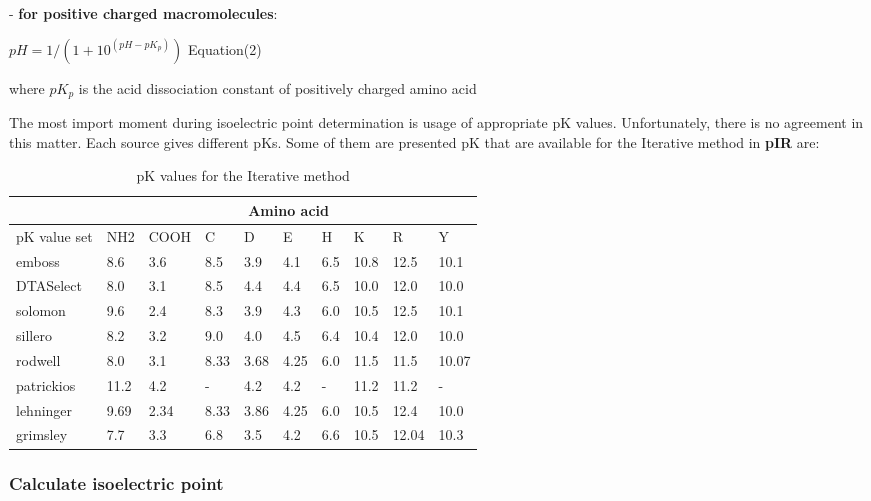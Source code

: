 \documentclass{article}
\begin{document}
- \textbf{for positive charged macromolecules}:

\begin{center}
       \( pH = 1/(1+10^{(pH - pK_p)}) \)   Equation(2)
\end{center}

where \(pK_p\) is the acid dissociation constant of positively charged amino acid


The most import moment during isoelectric point determination is usage of appropriate pK values. Unfortunately, there is no agreement in this matter. Each source gives different pKs. Some of them are presented pK that are available for the Iterative method in \textbf{pIR} are:

\begin{table}[h]
\centering
\caption{pK values for the Iterative method}
\label{my-label}
\begin{tabular}{|l|l|l|l|l|l|l|l|l|l|}
\hline
                   & \multicolumn{9}{c|}{{\bf Amino acid}}  \\ \hline
{pK value set} & NH2 & COOH & C & D & E & H & K & R & Y \\ \hline
emboss         & 8.6 & 3.6 & 8.5 & 3.9 & 4.1 & 6.5 & 10.8 & 12.5 & 10.1 \\ \hline
DTASelect      & 8.0 & 3.1 & 8.5 & 4.4 & 4.4 & 6.5 & 10.0 & 12.0 & 10.0 \\ \hline
solomon        & 9.6 & 2.4 & 8.3 & 3.9 & 4.3 & 6.0 & 10.5 & 12.5 & 10.1 \\ \hline
sillero        & 8.2 & 3.2 & 9.0 & 4.0 & 4.5 & 6.4 & 10.4 & 12.0 & 10.0 \\ \hline
rodwell        & 8.0 & 3.1 & 8.33 & 3.68 & 4.25 & 6.0 & 11.5 & 11.5 & 10.07 \\ \hline
patrickios     & 11.2 & 4.2 & - & 4.2 & 4.2 & - & 11.2 & 11.2 & -           \\ \hline
lehninger      & 9.69 & 2.34 & 8.33 & 3.86 & 4.25 & 6.0 & 10.5 & 12.4 & 10.0\\ \hline
grimsley       & 7.7 & 3.3 & 6.8 & 3.5 & 4.2 & 6.6 & 10.5 & 12.04 & 10.3    \\ \hline
\end{tabular}
\end{table}

\subsubsection{Calculate isoelectric point}
\end{document}
